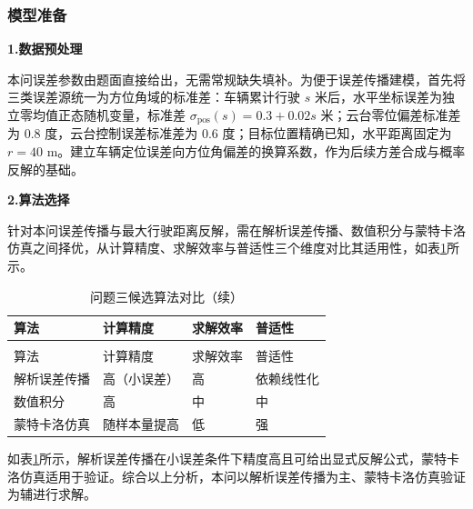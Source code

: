 
\subsubsection{模型准备}

\textbf{1.数据预处理}

本问误差参数由题面直接给出，无需常规缺失填补。为便于误差传播建模，首先将三类误差源统一为方位角域的标准差：车辆累计行驶 $s$ 米后，水平坐标误差为独立零均值正态随机变量，标准差 $\sigma_{\mathrm{pos}}(s)=0.3+0.02s$ 米；云台零位偏差标准差为 0.8 度，云台控制误差标准差为 0.6 度；目标位置精确已知，水平距离固定为 $r=40$ m。建立车辆定位误差向方位角偏差的换算系数，作为后续方差合成与概率反解的基础。

\textbf{2.算法选择}

针对本问误差传播与最大行驶距离反解，需在解析误差传播、数值积分与蒙特卡洛仿真之间择优，从计算精度、求解效率与普适性三个维度对比其适用性，如表\ref{tab:algo3}所示。

\begin{longtable}{>{\centering\arraybackslash}p{}>{\centering\arraybackslash}p{}>{\centering\arraybackslash}p{}>{\centering\arraybackslash}p{}}
  \caption{问题三候选算法对比}
  \label{tab:algo3} \\
  \toprule
  算法 & 计算精度 & 求解效率 & 普适性 \\
  \midrule
  \endfirsthead
  \caption{问题三候选算法对比（续）} \\
  \toprule
  算法 & 计算精度 & 求解效率 & 普适性 \\
  \midrule
  \endhead
  \bottomrule
  \endfoot
  解析误差传播 & 高（小误差） & 高 & 依赖线性化 \\
  数值积分 & 高 & 中 & 中 \\
  蒙特卡洛仿真 & 随样本量提高 & 低 & 强 \\
\end{longtable}

如表\ref{tab:algo3}所示，解析误差传播在小误差条件下精度高且可给出显式反解公式，蒙特卡洛仿真适用于验证。综合以上分析，本问以解析误差传播为主、蒙特卡洛仿真验证为辅进行求解。
